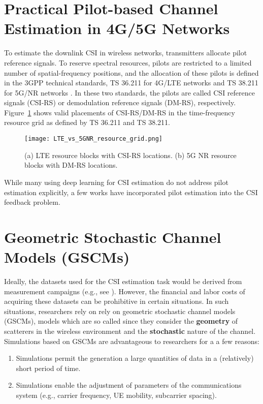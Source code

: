 \section{Practical Pilot-based Channel Estimation in 4G/5G Networks}
\label{sect:pilots}

To estimate the downlink CSI in wireless networks, transmitters allocate pilot reference signals. To reserve spectral resources, pilots are restricted to a limited number of spatial-frequency positions, and the allocation of these pilots is defined in the 3GPP technical standards, TS 36.211 for 4G/LTE networks \cite{ref:3gpp.36.211} and TS 38.211 for 5G/NR networks \cite{ref:3GPPTS38.211V15.8.0}. In these two standards, the pilots are called CSI reference signals (CSI-RS) or demodulation reference signals (DM-RS), respectively. Figure~\ref{fig:lte-vs-5g} shows valid placements of CSI-RS/DM-RS in the time-frequency resource grid as defined by TS 36.211 and TS 38.211.

\begin{figure}[!hbtp]
    \centering
    \texttt{[image: LTE\_vs\_5GNR\_resource\_grid.png]}
    \caption{(a) LTE resource blocks with CSI-RS locations. (b) 5G NR resource blocks with DM-RS locations.}
    \label{fig:lte-vs-5g}
\end{figure}

While many using deep learning for CSI estimation do not address pilot estimation explicitly, a few works have incorporated pilot estimation into the CSI feedback problem. 

\section{Geometric Stochastic Channel Models (GSCMs)}
\label{sect:channel_model}

Ideally, the datasets used for the CSI estimation task would be derived from measurement campaigns (e.g., see \cite{ref:shepard2016argoschannel,ref:du2021interuserangle,ref:li20222finegrained}). However, the financial and labor costs of acquiring these datasets can be prohibitive in certain situations. In such situations, researchers rely on  rely on geometric stochastic channel models (GSCMs), models which are so called since they consider the \textbf{geometry} of scatterers in the wireless environment and the \textbf{stochastic} nature of the channel. Simulations based on GSCMs are advantageous to researchers for a a few reasons:
\begin{enumerate}
	\item Simulations permit the generation a large quantities of data in a (relatively) short period of time.
	\item Simulations enable the adjustment of parameters of the communications system (e.g., carrier frequency, UE mobility, subcarrier spacing).
\end{enumerate}

